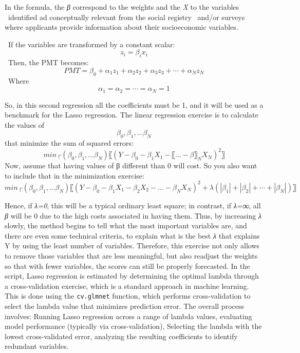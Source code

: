 \documentclass[
]{article}
\begin{document}
In the formula, the \emph{β} correspond to the weights and the \emph{X}
to the variables ~identified ad conceptually relevant from the social
registry ~and/or surveys where applicants provide information about
their socioeconomic variables.

~If the variables are transformed by a constant scalar: ~\[
 z_i=β_i x_i
 \] ~Then, the PMT becomes: ~\[
 PMT=β_0+α_1 z_1+α_2 z_2+α_3 z_3+⋯+α_N z_N
 \] ~Where \[α_1=α_2=⋯=α_N=1\]

So, in this second regression all the coefficients must be 1, and it
will be used as a benchmark for the Lasso regression. The linear
regression exercise is to calculate the values of \[β_0,β_1, … β_N\]
that minimize the sum of squared errors: \[
min┬(β_0,β_1,… β_N )⁡〖(Y-β_0-β_1 X_1-〖...- β〗_N X_N )^2 〗
\] Now, assume that having values of β different than 0 will cost. So
you also want to include that in the minimization exercise: \[
min┬(β_0,β_1,… β_N )⁡〖(Y-β_0-β_1 X_1-β_2 X_2-…-β_N X_N )^2+λ(|β_1 |+|β_2 |+⋯ +|β_N |)〗
\]

Hence, if \emph{λ=0}, this will be a typical ordinary least square; in
contrast, if \emph{λ=∞}, all \emph{β} will be 0 due to the high costs
associated in having them. Thus, by increasing \emph{λ} slowly, the
method begins to tell what the most important variables are, and there
are even some technical criteria, to explain what is the best \emph{λ}
that explains Y by using the least number of variables. Therefore, this
exercise not only allows to remove those variables that are less
meaningful, but also readjust the weights so that with fewer variables,
the scores can still be properly forecasted. In the script, Lasso
regression is estimated by determining the optimal lambda through a
cross-validation exercise, which is a standard approach in machine
learning. This is done using the \texttt{cv.glmnet} function, which
performs cross-validation to select the lambda value that minimizes
prediction error. The overall process involves: Running Lasso regression
across a range of lambda values, evaluating model performance (typically
via cross-validation), Selecting the lambda with the lowest
cross-validated error, analyzing the resulting coefficients to identify
redundant variables.
\end{document}
